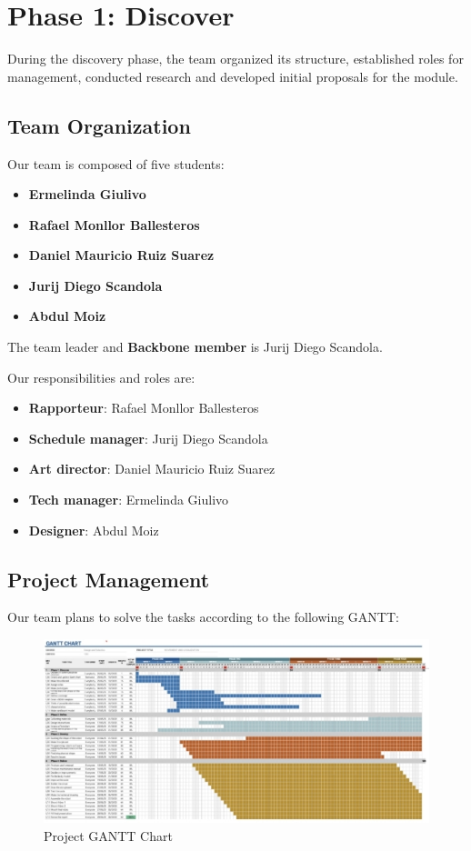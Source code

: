 \section{Phase 1: Discover}

During the discovery phase, the team organized its structure, established roles for management, conducted research and developed initial proposals for the module.

\subsection{Team Organization}

Our team is composed of five students:
\begin{itemize}
    \item \textbf{Ermelinda Giulivo}
    \item \textbf{Rafael Monllor Ballesteros}
    \item \textbf{Daniel Mauricio Ruiz Suarez}
    \item \textbf{Jurij Diego Scandola}
    \item \textbf{Abdul Moiz}
\end{itemize}

The team leader and \textbf{Backbone member} is Jurij Diego Scandola.

Our responsibilities and roles are:
\begin{itemize}
    \item \textbf{Rapporteur}: Rafael Monllor Ballesteros
    \item \textbf{Schedule manager}: Jurij Diego Scandola
    \item \textbf{Art director}: Daniel Mauricio Ruiz Suarez
    \item \textbf{Tech manager}: Ermelinda Giulivo
    \item \textbf{Designer}: Abdul Moiz
\end{itemize}

\subsection{Project Management}

Our team plans to solve the tasks according to the following GANTT:

\begin{figure}[H]
    \centering
    \includegraphics[width=0.85\linewidth]{../ReportMovementModule/images/Aspose.Words.728084da-df58-4b9d-a372-f65cffbdb23d.001.jpeg}
    \caption{Project GANTT Chart}
\end{figure}

